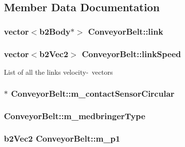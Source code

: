 \subsection{Member Data Documentation}
\hypertarget{classConveyorBelt_a21237fddbc2791faf8e26fd346ac8434}{
\subsubsection[{link}]{\setlength{\rightskip}{0pt plus 5cm}vector$<$b2\-Body$\ast$$>$ Conveyor\-Belt\-::link}}\label{classConveyorBelt_a21237fddbc2791faf8e26fd346ac8434}
\hypertarget{classConveyorBelt_a1dbc93fa0310c47d89f234602fc8610e}{
\subsubsection[{link\-Speed}]{\setlength{\rightskip}{0pt plus 5cm}vector$<$b2\-Vec2$>$ Conveyor\-Belt\-::link\-Speed}}\label{classConveyorBelt_a1dbc93fa0310c47d89f234602fc8610e}
List of all the links velocity-\/ vectors \hypertarget{classConveyorBelt_a35e3eacb4d9a46fd58505dba22a020c5}{
\subsubsection[{m\-\_\-contact\-Sensor\-Circular}]{$\ast$ Conveyor\-Belt\-::m\-\_\-contact\-Sensor\-Circular}}\label{classConveyorBelt_a35e3eacb4d9a46fd58505dba22a020c5}
\hypertarget{classConveyorBelt_a92464da95aad2012ab4fcb0c1a998f42}{
\subsubsection[{m\-\_\-medbringer\-Type}]{ Conveyor\-Belt\-::m\-\_\-medbringer\-Type}}\label{classConveyorBelt_a92464da95aad2012ab4fcb0c1a998f42}
\hypertarget{classConveyorBelt_ad22553d91da070067703878c4059ecf5}{
\subsubsection[{m\-\_\-p1}]{\setlength{\rightskip}{0pt plus 5cm}b2\-Vec2 Conveyor\-Belt\-::m\-\_\-p1}}\label{classConveyorBelt_ad22553d91da070067703878c4059ecf5}
